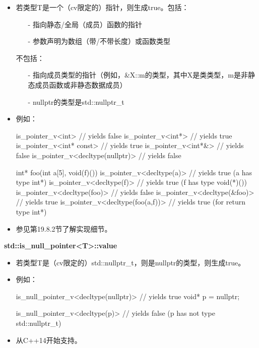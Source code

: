 \begin{itemize}
\item 
若类型T是一个（cv限定的）指针，则生成true。包括：
\begin{itemize}

\item[-] 
指向静态/全局（成员）函数的指针

\item[-] 
参数声明为数组（带/不带长度）或函数类型
\end{itemize}

不包括：

\begin{itemize}
\item[-] 
指向成员类型的指针（例如，\&X::m的类型，其中X是类类型，m是非静态成员函数或非静态数据成员）

\item[-] 
nullptr的类型是std::nullptr\_t
\end{itemize}

\item 
例如：

\begin{cpp}
is_pointer_v<int> // yields false
is_pointer_v<int*> // yields true
is_pointer_v<int* const> // yields true
is_pointer_v<int*&> // yields false
is_pointer_v<decltype(nullptr)> // yields false

int* foo(int a[5], void(f)())
{
	is_pointer_v<decltype(a)> // yields true (a has type int*)
	is_pointer_v<decltype(f)> // yields true (f has type void(*)())
	is_pointer_v<decltype(foo)> // yields false
	is_pointer_v<decltype(&foo)> // yields true
	is_pointer_v<decltype(foo(a,f))> // yields true (for return type int*)
}
\end{cpp}

\item 
参见第19.8.2节了解实现细节。
\end{itemize}

\textbf{std::is\_null\_pointer<T>::value}

\begin{itemize}
\item 
若类型T是（cv限定的）std::nullptr\_t，则是nullptr的类型，则生成true。

\item 
例如：
\begin{cpp}
is_null_pointer_v<decltype(nullptr)> // yields true
void* p = nullptr;

is_null_pointer_v<decltype(p)> // yields false (p has not type std::nullptr_t)
\end{cpp}

\item 
从C++14开始支持。
\end{itemize}

